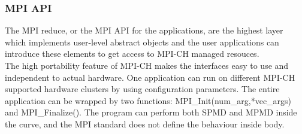 \documentclass[11pt,openright,a4paper]{report}
\begin{document}
\subsubsection{MPI API}
The MPI reduce, or the MPI API for the applications, are the highest layer which implements user-level abstract objects and the user applications can introduce these elements to get access to MPI-CH managed resouces.\\
The high portability feature of MPI-CH makes the interfaces easy to use and independent to actual hardware. One application can run on different MPI-CH supported hardware clusters by using configuration parameters. The entire application can be wrapped by two functions: MPI\_Init(num\_arg,*vec\_args) and MPI\_Finalize(). The program can perform both SPMD and MPMD inside the curve, and the MPI standard does not define the behaviour inside body\cite{mpich_doc}.\\  
\end{document}
